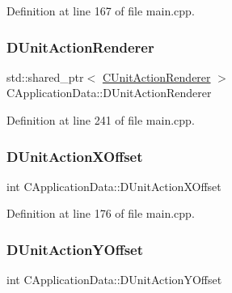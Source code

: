 Definition at line 167 of file main.\+cpp.

\hypertarget{classCApplicationData_a5aca1f832dd6387662f0d4441745cf6f}{}\label{classCApplicationData_a5aca1f832dd6387662f0d4441745cf6f} 
\subsubsection{\texorpdfstring{D\+Unit\+Action\+Renderer}{DUnitActionRenderer}}
{\footnotesize\ttfamily std\+::shared\+\_\+ptr$<$ \hyperlink{classCUnitActionRenderer}{C\+Unit\+Action\+Renderer} $>$ C\+Application\+Data\+::\+D\+Unit\+Action\+Renderer\hspace{0.3cm}{\ttfamily [protected]}}



Definition at line 241 of file main.\+cpp.

\hypertarget{classCApplicationData_aa47b53d283617575a4866c08d83e27c4}{}\label{classCApplicationData_aa47b53d283617575a4866c08d83e27c4} 
\subsubsection{\texorpdfstring{D\+Unit\+Action\+X\+Offset}{DUnitActionXOffset}}
{\footnotesize\ttfamily int C\+Application\+Data\+::\+D\+Unit\+Action\+X\+Offset\hspace{0.3cm}{\ttfamily [protected]}}



Definition at line 176 of file main.\+cpp.

\hypertarget{classCApplicationData_a8ccfb55bd25cba0e6eb66573ba9c8b3c}{}\label{classCApplicationData_a8ccfb55bd25cba0e6eb66573ba9c8b3c} 
\subsubsection{\texorpdfstring{D\+Unit\+Action\+Y\+Offset}{DUnitActionYOffset}}
{\footnotesize\ttfamily int C\+Application\+Data\+::\+D\+Unit\+Action\+Y\+Offset\hspace{0.3cm}{\ttfamily [protected]}}



